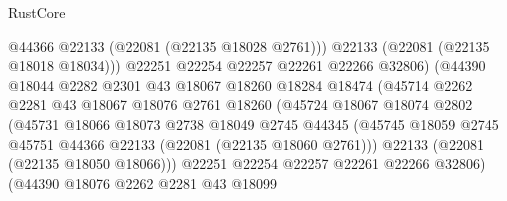 \begin{lexlean}{RustCore}
\begin{coremodule}
                                    @44366
                                    @22133
                                    (@22081 (@22135 @18028 @2761)))
                                  @22133
                                  (@22081 (@22135 @18018 @18034)))
                                @22251
                                @22254
                                @22257
                                @22261
                                @22266
                                @32806)
                              (@44390
                                @18044
                                @2282
                                @2301
                                @43
                                @18067
                                @18260
                                @18284
                                @18474
                                (@45714
                                  @2262
                                  @2281
                                  @43
                                  @18067
                                  @18076
                                  @2761
                                  @18260
                                  (@45724
                                    @18067
                                    @18074
                                    @2802
                                    (@45731
                                      @18066
                                      @18073
                                      @2738
                                      @18049
                                      @2745
                                      @44345
                                      (@45745
                                        @18059
                                        @2745
                                        @45751
                                        @44366
                                        @22133
                                        (@22081 (@22135 @18060 @2761)))
                                      @22133
                                      (@22081 (@22135 @18050 @18066)))
                                    @22251
                                    @22254
                                    @22257
                                    @22261
                                    @22266
                                    @32806)
                                  (@44390
                                    @18076
                                    @2262
                                    @2281
                                    @43
                                    @18099

\end{coremodule}
\end{lexlean}
